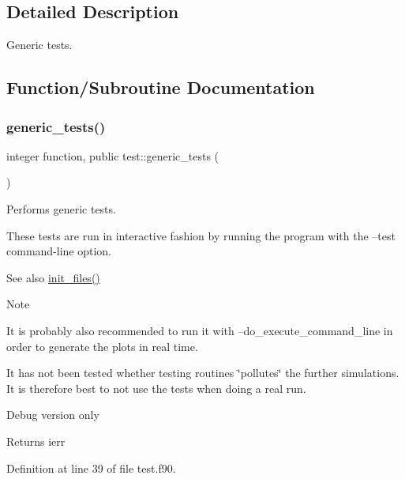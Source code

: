 \subsection{Detailed Description}
Generic tests. 

\subsection{Function/\+Subroutine Documentation}
\mbox{\label{namespacetest_aca21ee464c0b1f4b617177afdde110ec}} 
\subsubsection{\texorpdfstring{generic\+\_\+tests()}{generic\_tests()}}
{\footnotesize\ttfamily integer function, public test\+::generic\+\_\+tests (\begin{DoxyParamCaption}{ }\end{DoxyParamCaption})}



Performs generic tests. 

These tests are run in interactive fashion by running the program with the {\ttfamily --test} command-\/line option. \begin{DoxySeeAlso}{See also}
\hyperlink{namespacefiles__ops_a1e219b1147f109f758d03bef89d540e8}{init\+\_\+files()}
\end{DoxySeeAlso}
\begin{DoxyNote}{Note}

\begin{DoxyEnumerate}
\item It is probably also recommended to run it with {\ttfamily --do\+\_\+execute\+\_\+command\+\_\+line} in order to generate the plots in real time.
\item It has not been tested whether testing routines \char`\"{}pollutes\char`\"{} the further simulations. It is therefore best to not use the tests when doing a real run.
\end{DoxyEnumerate}

Debug version only
\end{DoxyNote}
\begin{DoxyReturn}{Returns}
ierr 
\end{DoxyReturn}


Definition at line 39 of file test.\+f90.

